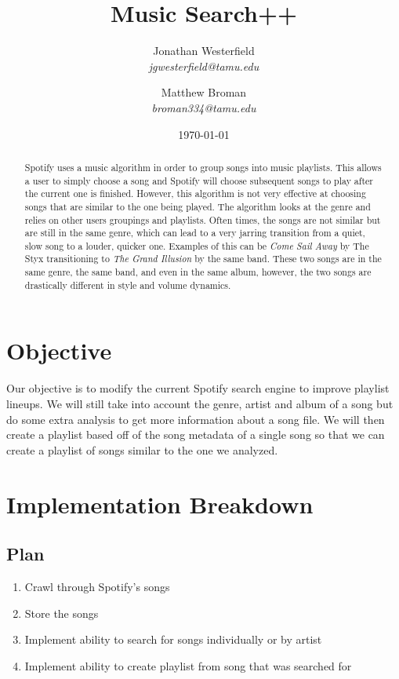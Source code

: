 \documentclass [letter,12pt] {article}
\title{\huge{\textbf{Music Search++}}}
\author{Jonathan Westerfield \\ \textit{jgwesterfield@tamu.edu}
        \and Matthew Broman \\ \textit{broman334@tamu.edu}}
\date{\today}
\begin{document}
\maketitle

\begin{abstract}
    Spotify uses a music algorithm in order to group songs into music
    playlists. This allows a user to simply choose a song and Spotify will
    choose subsequent songs to play after the current one is finished.
    However, this algorithm is not very effective at choosing songs that are
    similar to the one being played. The algorithm looks at the genre and
    relies on other users groupings and playlists. Often times, the songs
    are not similar but are still in the same genre, which can lead to a
    very jarring transition from a quiet, slow song to a louder, quicker
    one. Examples of this can be \textit{Come Sail Away} by The Styx transitioning to
    \textit{The Grand Illusion} by the same band. These two songs are in the same
    genre, the same band, and even in the same album, however, the two songs
    are drastically different in style and volume dynamics.
    
\end{abstract}

\newpage

\section{Objective}
    Our objective is to modify the current Spotify search engine to improve playlist lineups. We will still take into account the genre, artist and album of a song but do some extra analysis to get more information about a song file. We will then create a playlist based off of the song metadata of a single song so that we can create a playlist of songs similar to the one we analyzed.
    
\section{Implementation Breakdown}
    \subsection{Plan}
        \begin{enumerate}
            \item Crawl through Spotify’s songs 
            \item Store the songs
            \item Implement ability to search for songs individually 
                or by artist
            \item Implement ability to create playlist from song that 
                was searched for
        \end{enumerate}
        
\end{document}
